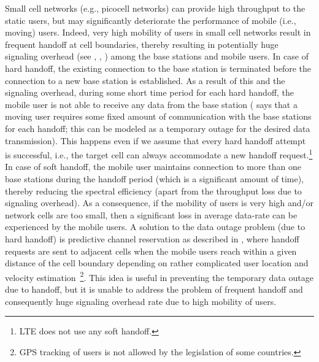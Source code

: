 \documentclass[10pt,journal]{IEEEtran}
\begin{document}
Small cell networks (e.g., picocell networks) can provide high throughput to the static users,
but may significantly deteriorate the performance of mobile (i.e., moving) users.
Indeed, very high mobility of users in small cell networks 
result in frequent handoff at  cell boundaries, thereby resulting in 
potentially huge signaling overhead 
(see \cite{camp-etal02survey-mobility-models}, \cite{halepovic-williamson05mobility-cellular-data-network}, 
\cite{akyildiz-etal99mobility-management-next-generation-wireless})
among the base stations and mobile users. 
In case of hard handoff, the existing connection to the base station is terminated before the connection 
to a new base station is established. As a result of this and the signaling overhead, during 
some short time period for each hard handoff, 
the mobile user is not able to receive any data from the base station 
(\cite[Section~]{kavitha-etal11spatial-queueing-picocells} says that a moving user requires some fixed 
amount of communication with the base stations 
for each handoff; this can be modeled as a temporary outage for the desired data transmission). This happens 
even if we assume that every hard handoff attempt is successful, i.e., the target cell can always accommodate a new 
handoff request.\footnote{LTE does not use any soft handoff.} 
In case of soft handoff, the mobile user maintains connection to more than one base stations during the 
handoff period (which is a significant amount of time), thereby reducing the spectral efficiency (apart 
from the throughput loss due to signaling overhead). 
As a consequence, if the mobility of users is very high and/or network
cells are too small, then a significant loss in average data-rate can
be experienced by the mobile users. 
A solution to the data outage problem (due to hard handoff)  
is predictive channel reservation as described in \cite{ye-etal06predictive-channel-reservation-handoff-prioritization}, where handoff 
requests are sent to adjacent cells when the mobile users reach within
a given distance of the cell boundary depending on rather complicated 
user location and velocity estimation~\footnote{GPS tracking of users is not allowed by the legislation  of some countries.}. 
This idea is useful in preventing 
the temporary data outage due to handoff, but it is unable to address the
problem of frequent handoff and consequently huge signaling overhead rate due to
high mobility of users.
\end{document}
